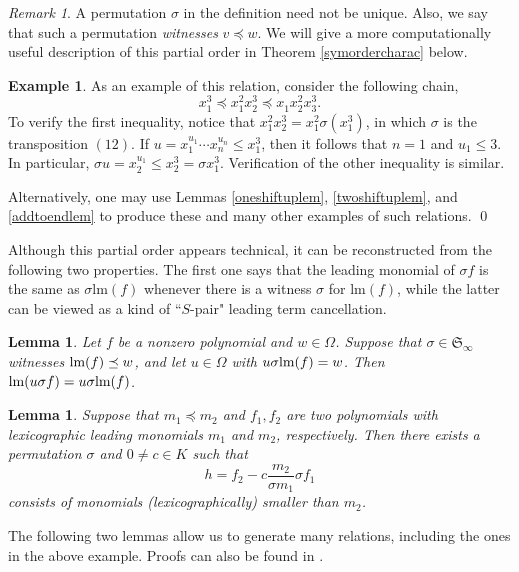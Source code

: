 \documentclass{amsart}
\newtheorem{lemma}[theorem]{Lemma}
\theoremstyle{definition}
\newtheorem{example}[theorem]{Example}
\theoremstyle{remark}
\newtheorem{remark}[theorem]{Remark}
\numberwithin{equation}{section}
\newcommand{\<}{\langle}
\renewcommand{\>}{\rangle}
\begin{document}
\begin{remark} A permutation $\sigma$ in the definition need
not be unique.  Also, we say that such a permutation \textit{witnesses} $v\preceq w$.
We will give a more computationally useful description of this partial order
in Theorem \ref{symordercharac} below.
\end{remark}

\begin{example}
As an example of this relation, consider the following
chain, \[x_1^3 \preceq x_1^2x_2^3 \preceq x_1^{\phantom{2}} x_2^{2} x_3^3.\]  To
verify the first inequality, notice that $x_1^2 x_2^3 = x_1^2 \sigma
(x_1^3)$, in which $\sigma$ is the transposition $(12)$.  If $u =
x_1^{u_1}\cdots x_n^{u_n} \leq x_1^3$, then it follows that $n =
1$ and $u_1 \leq 3$.  In particular, $\sigma u = x_2^{u_1}
\leq x_2^3  = \sigma x_1^3$.  Verification of the other inequality is similar.  

Alternatively, one may use Lemmas \ref{oneshiftuplem},  \ref{twoshiftuplem}, and
\ref{addtoendlem} to produce these and many other examples of such relations.  \qed
\end{example}

Although this partial order appears technical, it can be reconstructed from
the following two properties.  The first one says that the leading monomial 
of $\sigma f$ is the same as $\sigma \text{lm}(f)$ whenever there is a witness
$\sigma$ for lm$(f)$, while the latter can be viewed as a kind of  ``$S$-pair" leading term cancellation.

\begin{lemma}\label{cancellation}
Let $f$ be a nonzero polynomial and $w\in \Omega$.  Suppose that
$\sigma\in {\mathfrak S}_\infty$ witnesses $\text{\rm lm}(f)\preceq w$, and let $u\in \Omega$
with $u\sigma \text{\rm lm}(f)=w$. Then $\text{\rm lm}(u\sigma f)=u\sigma\text{\rm lm}(f)$.
\end{lemma}

\begin{lemma}
Suppose that $m_1 \preceq m_2$ and $f_1, f_2$ are two polynomials with 
lexicographic leading monomials $m_1$ and $m_2$, respectively.  
Then there exists a permutation $\sigma$
and $0 \neq c \in K$ such that \[ h = f_2 - c \frac{m_2}{\sigma m_1} \sigma f_1\] 
consists of monomials (lexicographically) smaller than $m_2$.
\end{lemma}

The following two lemmas allow us to generate many relations, including the
ones in the above example.  Proofs can also be found in \cite{AH}.
\end{document}
